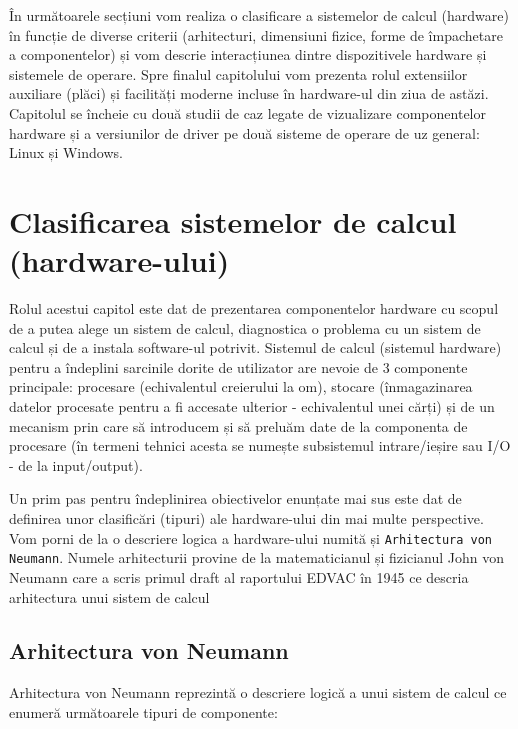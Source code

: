 În următoarele secțiuni vom realiza o clasificare a sistemelor de calcul
(hardware) în funcție de diverse criterii (arhitecturi, dimensiuni fizice, forme
de împachetare a componentelor) și vom descrie interacțiunea dintre
dispozitivele hardware și sistemele de operare. Spre finalul capitolului vom
prezenta rolul extensiilor auxiliare (plăci) și facilități moderne incluse în
hardware-ul din ziua de astăzi. Capitolul se încheie cu două studii de caz
legate de vizualizare componentelor hardware și a versiunilor de driver pe două
sisteme de operare de uz general: Linux și Windows.

\section{Clasificarea sistemelor de calcul (hardware-ului)}
\label{sec:hardware-class}

Rolul acestui capitol este dat de prezentarea componentelor hardware cu scopul
de a putea alege un sistem de calcul, diagnostica o problema cu un sistem de
calcul și de a instala software-ul potrivit. Sistemul de calcul (sistemul
hardware) pentru a îndeplini sarcinile dorite de utilizator are nevoie de 3
componente principale: procesare (echivalentul creierului la om), stocare
(înmagazinarea datelor procesate pentru a fi accesate ulterior - echivalentul
unei cărți) și de un mecanism prin care să introducem și să preluăm date de la
componenta de procesare (în termeni tehnici acesta se numește subsistemul
intrare/ieșire sau I/O - de la input/output).

Un prim pas pentru îndeplinirea obiectivelor enunțate mai sus este dat de
definirea unor clasificări (tipuri) ale hardware-ului din mai multe perspective.
Vom porni de la o descriere logica a hardware-ului numită și \texttt{Arhitectura
von Neumann}. Numele arhitecturii provine de la matematicianul și fizicianul
John von Neumann care a scris primul draft al raportului EDVAC
 în 1945 ce
descria arhitectura unui sistem de calcul


\subsection{Arhitectura von Neumann}
\label{sec:hardware-class-neumann}

Arhitectura von Neumann reprezintă o descriere logică a unui sistem de calcul ce
enumeră următoarele tipuri de componente:

